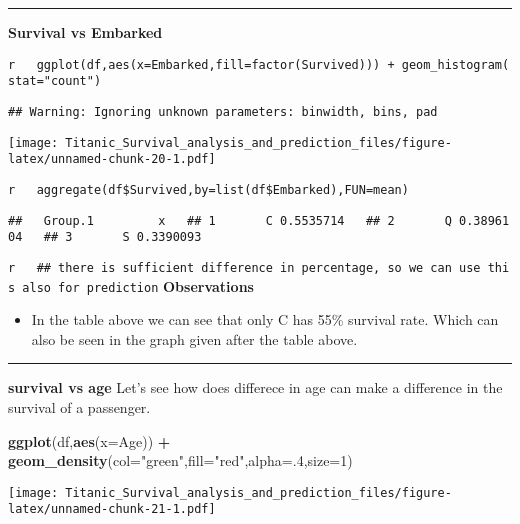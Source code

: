 \documentclass[]{article}
\newenvironment{Shaded}{\begin{snugshade}}{\end{snugshade}}
\newcommand{\KeywordTok}[1]{\textcolor[rgb]{0.13,0.29,0.53}{\textbf{#1}}}
\newcommand{\DataTypeTok}[1]{\textcolor[rgb]{0.13,0.29,0.53}{#1}}
\newcommand{\DecValTok}[1]{\textcolor[rgb]{0.00,0.00,0.81}{#1}}
\newcommand{\StringTok}[1]{\textcolor[rgb]{0.31,0.60,0.02}{#1}}
\newcommand{\OperatorTok}[1]{\textcolor[rgb]{0.81,0.36,0.00}{\textbf{#1}}}
\newcommand{\NormalTok}[1]{#1}
\providecommand{\tightlist}{%
  \setlength{\itemsep}{0pt}\setlength{\parskip}{0pt}}
\begin{document}
\begin{center}\rule{0.5\linewidth}{\linethickness}\end{center}

\textbf{Survival vs Embarked}

\texttt{r\ \ \ ggplot(df,aes(x=Embarked,fill=factor(Survived)))\ +\ geom\_histogram(stat="count")}

\texttt{\#\#\ Warning:\ Ignoring\ unknown\ parameters:\ binwidth,\ bins,\ pad}

\texttt{[image: Titanic\_Survival\_analysis\_and\_prediction\_files/figure-latex/unnamed-chunk-20-1.pdf]}

\texttt{r\ \ \ aggregate(df\$Survived,by=list(df\$Embarked),FUN=mean)}

\texttt{\#\#\ \ \ Group.1\ \ \ \ \ \ \ \ \ x\ \ \ \#\#\ 1\ \ \ \ \ \ \ C\ 0.5535714\ \ \ \#\#\ 2\ \ \ \ \ \ \ Q\ 0.3896104\ \ \ \#\#\ 3\ \ \ \ \ \ \ S\ 0.3390093}

\texttt{r\ \ \ \#\#\ there\ is\ sufficient\ difference\ in\ percentage,\ so\ we\ can\ use\ this\ also\ for\ prediction}
\textbf{Observations}

\begin{itemize}
\tightlist
\item
  In the table above we can see that only C has 55\% survival rate.
  Which can also be seen in the graph given after the table above.
\end{itemize}

\begin{center}\rule{0.5\linewidth}{\linethickness}\end{center}

\textbf{survival vs age} Let's see how does differece in age can make a
difference in the survival of a passenger.

\begin{Shaded}
\begin{Highlighting}[]
\KeywordTok{ggplot}\NormalTok{(df,}\KeywordTok{aes}\NormalTok{(}\DataTypeTok{x=}\NormalTok{Age)) }\OperatorTok{+}\StringTok{ }\KeywordTok{geom_density}\NormalTok{(}\DataTypeTok{col=}\StringTok{"green"}\NormalTok{,}\DataTypeTok{fill=}\StringTok{"red"}\NormalTok{,}\DataTypeTok{alpha=}\NormalTok{.}\DecValTok{4}\NormalTok{,}\DataTypeTok{size=}\DecValTok{1}\NormalTok{)}
\end{Highlighting}
\end{Shaded}

\texttt{[image: Titanic\_Survival\_analysis\_and\_prediction\_files/figure-latex/unnamed-chunk-21-1.pdf]}
\end{document}
